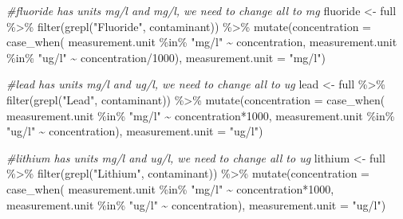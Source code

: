 \documentclass[12pt, twoside]{amherstthesis}
\newenvironment{Shaded}{\begin{snugshade}}{\end{snugshade}}
\newcommand{\AttributeTok}[1]{\textcolor[rgb]{0.77,0.63,0.00}{#1}}
\newcommand{\CommentTok}[1]{\textcolor[rgb]{0.56,0.35,0.01}{\textit{#1}}}
\newcommand{\DecValTok}[1]{\textcolor[rgb]{0.00,0.00,0.81}{#1}}
\newcommand{\FunctionTok}[1]{\textcolor[rgb]{0.00,0.00,0.00}{#1}}
\newcommand{\NormalTok}[1]{#1}
\newcommand{\OtherTok}[1]{\textcolor[rgb]{0.56,0.35,0.01}{#1}}
\newcommand{\SpecialCharTok}[1]{\textcolor[rgb]{0.00,0.00,0.00}{#1}}
\newcommand{\StringTok}[1]{\textcolor[rgb]{0.31,0.60,0.02}{#1}}
\begin{document}
\begin{Shaded}
\begin{Highlighting}[]
\CommentTok{\#fluoride has units mg/l and mg/l, we need to change all to mg}
\NormalTok{fluoride }\OtherTok{\textless{}{-}}\NormalTok{ full }\SpecialCharTok{\%\textgreater{}\%}
  \FunctionTok{filter}\NormalTok{(}\FunctionTok{grepl}\NormalTok{(}\StringTok{"Fluoride"}\NormalTok{, contaminant)) }\SpecialCharTok{\%\textgreater{}\%}
  \FunctionTok{mutate}\NormalTok{(}\AttributeTok{concentration =} 
           \FunctionTok{case\_when}\NormalTok{(}
\NormalTok{             measurement.unit }\SpecialCharTok{\%in\%} \StringTok{"mg/l"} \SpecialCharTok{\textasciitilde{}}\NormalTok{ concentration,}
\NormalTok{             measurement.unit }\SpecialCharTok{\%in\%} \StringTok{"ug/l"} \SpecialCharTok{\textasciitilde{}}\NormalTok{ concentration}\SpecialCharTok{/}\DecValTok{1000}\NormalTok{),}
         \AttributeTok{measurement.unit =} \StringTok{"mg/l"}\NormalTok{)}

\CommentTok{\#lead has units mg/l and ug/l, we need to change all to ug}
\NormalTok{lead }\OtherTok{\textless{}{-}}\NormalTok{ full }\SpecialCharTok{\%\textgreater{}\%}
  \FunctionTok{filter}\NormalTok{(}\FunctionTok{grepl}\NormalTok{(}\StringTok{"Lead"}\NormalTok{, contaminant)) }\SpecialCharTok{\%\textgreater{}\%}
  \FunctionTok{mutate}\NormalTok{(}\AttributeTok{concentration =} 
           \FunctionTok{case\_when}\NormalTok{(}
\NormalTok{             measurement.unit }\SpecialCharTok{\%in\%} \StringTok{"mg/l"} \SpecialCharTok{\textasciitilde{}}\NormalTok{ concentration}\SpecialCharTok{*}\DecValTok{1000}\NormalTok{,}
\NormalTok{             measurement.unit }\SpecialCharTok{\%in\%} \StringTok{"ug/l"} \SpecialCharTok{\textasciitilde{}}\NormalTok{ concentration),}
         \AttributeTok{measurement.unit =} \StringTok{"ug/l"}\NormalTok{)}

\CommentTok{\#lithium has units mg/l and ug/l, we need to change all to ug}
\NormalTok{lithium }\OtherTok{\textless{}{-}}\NormalTok{ full }\SpecialCharTok{\%\textgreater{}\%}
  \FunctionTok{filter}\NormalTok{(}\FunctionTok{grepl}\NormalTok{(}\StringTok{"Lithium"}\NormalTok{, contaminant)) }\SpecialCharTok{\%\textgreater{}\%}
  \FunctionTok{mutate}\NormalTok{(}\AttributeTok{concentration =} 
           \FunctionTok{case\_when}\NormalTok{(}
\NormalTok{             measurement.unit }\SpecialCharTok{\%in\%} \StringTok{"mg/l"} \SpecialCharTok{\textasciitilde{}}\NormalTok{ concentration}\SpecialCharTok{*}\DecValTok{1000}\NormalTok{,}
\NormalTok{             measurement.unit }\SpecialCharTok{\%in\%} \StringTok{"ug/l"} \SpecialCharTok{\textasciitilde{}}\NormalTok{ concentration),}
         \AttributeTok{measurement.unit =} \StringTok{"ug/l"}\NormalTok{)}



\end{Highlighting}
\end{Shaded}
\end{document}

